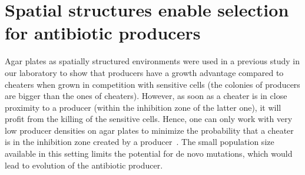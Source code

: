 \section{Spatial structures enable selection for antibiotic producers}
\label{sec:spatial_structure}

Agar plates as spatially structured environments were used in a previous study in our laboratory to show that producers have a growth advantage compared to cheaters when grown in competition with sensitive cells (the colonies of producers are bigger than the ones of cheaters). However, as soon as a cheater is in close proximity to a producer (within the inhibition zone of the latter one), it will profit from the killing of the sensitive cells. Hence, one can only work with very low producer densities on agar plates to minimize the probability that a cheater is in the inhibition zone created by a producer~\cite{Gerardin2016-ac}. The small population size available in this setting limits the potential for de novo mutations, which would lead to evolution of the antibiotic producer.

